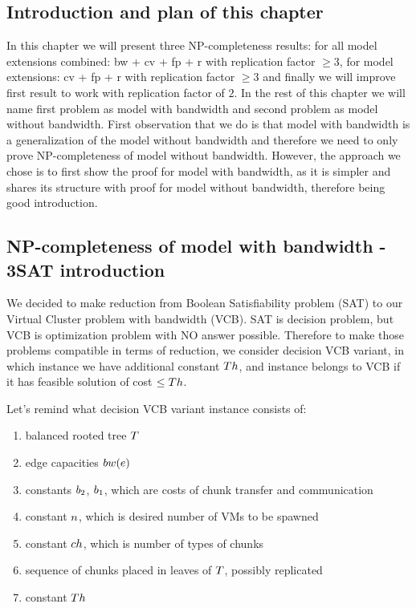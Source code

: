 \subsection{Introduction and plan of this chapter}

In this chapter we will present three NP-completeness results: for all
model extensions combined: bw + cv + fp + r with replication factor
$\geq 3$, for model extensions: cv + fp + r with replication factor
$\geq 3$ and finally we will improve first result to work with
replication factor of $2$. In the rest of this chapter we will name
first problem as model with bandwidth and second problem as model
without bandwidth. First observation that we do is that model with
bandwidth is a generalization of the model without bandwidth and
therefore we need to only prove NP-completeness of model without
bandwidth. However, the approach we chose is to first show the proof
for model with bandwidth, as it is simpler and shares its structure
with proof for model without bandwidth, therefore being good
introduction.

\subsection{NP-completeness of model with bandwidth -
 3SAT introduction}

We decided to make reduction from Boolean Satisfiability problem (SAT)
to our Virtual Cluster problem with bandwidth (VCB). SAT is decision
problem, but VCB is optimization problem with NO answer
possible. Therefore to make those problems compatible in terms of
reduction, we consider decision VCB variant, in which instance we have
additional constant $Th$, and instance belongs to VCB if it has feasible
solution of cost $\leq Th$.

Let's remind what decision VCB variant instance consists of:
\begin{enumerate}
\item balanced rooted tree $T$ 
\item edge capacities $bw(e)$
\item constants $b_2$, $b_1$, which are costs of chunk transfer and
communication
\item constant $n$, which is desired number of VMs to be spawned
\item constant $ch$, which is number of types of chunks
\item sequence of chunks placed in leaves of $T$, possibly replicated
\item constant $Th$
\end{enumerate}

